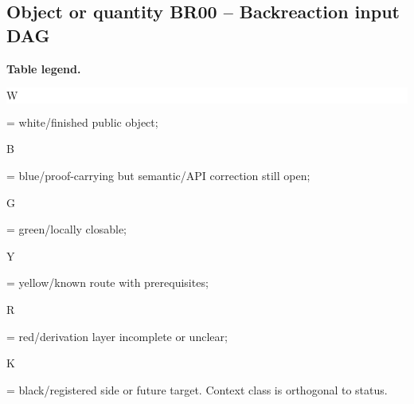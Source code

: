 \subsection*{Object or quantity BR00 -- Backreaction input DAG}
\hypertarget{objproof:BR00}{}
\par\smallskip\noindent\begin{minipage}{0.99\linewidth}\footnotesize\raggedright\textbf{Table legend.} \colorbox{white}{\strut W} = white/finished public object; \colorbox{cyan!20}{\strut B} = blue/proof-carrying but semantic/API correction still open; \colorbox{green!18}{\strut G} = green/locally closable; \colorbox{yellow!25}{\strut Y} = yellow/known route with prerequisites; \colorbox{red!20}{\strut R} = red/derivation layer incomplete or unclear; \colorbox{black!18}{\strut K} = black/registered side or future target. Context class is orthogonal to status.\end{minipage}\par\vspace{0.25em}
